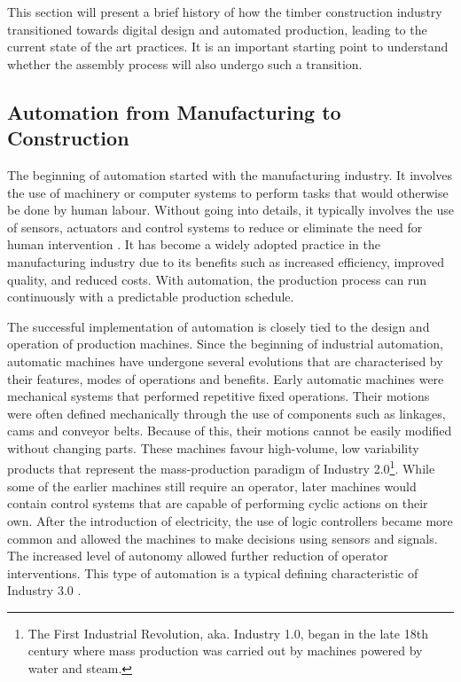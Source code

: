This section will present a brief history of how the timber construction industry transitioned towards digital design and automated production, leading to the current state of the art practices. It is an important starting point to understand whether the assembly process will also undergo such a transition. 

\subsection{Automation from Manufacturing to Construction}
\label{subsection:introduction-automation-from-manufacturing-to-construction}

The beginning of automation started with the manufacturing industry. It involves the use of machinery or computer systems to perform tasks that would otherwise be done by human labour. Without going into details, it typically involves the use of sensors, actuators and control systems to reduce or eliminate the need for human intervention \parencite{nofSpringerHandbookAutomation2009}. It has become a widely adopted practice in the manufacturing industry due to its benefits such as increased efficiency, improved quality, and reduced costs. With automation, the production process can run continuously with a predictable production schedule.

The successful implementation of automation is closely tied to the design and operation of production machines. Since the beginning of industrial automation, automatic machines have undergone several evolutions that are characterised by their features, modes of operations and benefits. Early automatic machines were mechanical systems that performed repetitive fixed operations. Their motions were often defined mechanically through the use of components such as linkages, cams and conveyor belts. Because of this, their motions cannot be easily modified without changing parts. These machines favour high-volume, low variability products that represent the mass-production paradigm of Industry 2.0\footnote{The First Industrial Revolution, aka. Industry 1.0, began in the late 18th century where mass production was carried out by machines powered by water and steam.}.
While some of the earlier machines still require an operator, later machines would contain control systems that are capable of performing cyclic actions on their own. After the introduction of electricity, the use of logic controllers became more common and allowed the machines to make decisions using sensors and signals. The increased level of autonomy allowed further reduction of operator interventions. This type of automation is a typical defining characteristic of Industry 3.0 \parencite{mengesNewCyberPhysicalMaking2015,yinEvolutionProductionSystems2018}. 

